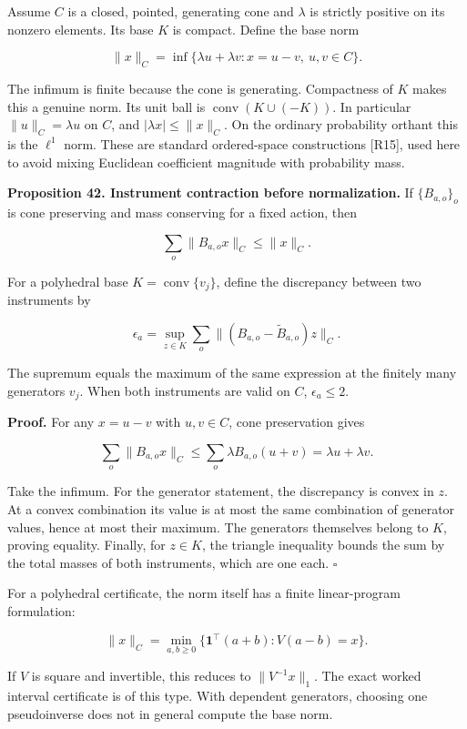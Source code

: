 \documentclass[11pt,letterpaper]{article}
\begin{document}
Assume \(C\) is a closed, pointed, generating cone and \(\lambda\) is
strictly positive on its nonzero elements. Its base \(K\) is compact.
Define the base norm

\[
\|x\|_C=\inf\{\lambda u+\lambda v:x=u-v,\ u,v\in C\}.
\]

The infimum is finite because the cone is generating. Compactness of
\(K\) makes this a genuine norm. Its unit ball is
\(\operatorname{conv}(K\cup(-K))\). In particular \(\|u\|_C=\lambda u\)
on \(C\), and \(|\lambda x|\leq\|x\|_C\). On the ordinary probability
orthant this is the \(\ell^1\) norm. These are standard ordered-space
constructions {[}R15{]}, used here to avoid mixing Euclidean coefficient
magnitude with probability mass.

\textbf{Proposition 42. Instrument contraction before normalization.} If
\(\{B_{a,o}\}_o\) is cone preserving and mass conserving for a fixed
action, then

\[
\boxed{\sum_o\|B_{a,o}x\|_C\leq\|x\|_C.}
\]

For a polyhedral base \(K=\operatorname{conv}\{v_j\}\), define the
discrepancy between two instruments by

\[
\epsilon_a=\sup_{z\in K}\sum_o
\|(B_{a,o}-\widetilde B_{a,o})z\|_C.
\]

The supremum equals the maximum of the same expression at the finitely
many generators \(v_j\). When both instruments are valid on \(C\),
\(\epsilon_a\leq2\).

\textbf{Proof.} For any \(x=u-v\) with \(u,v\in C\), cone preservation
gives

\[
\sum_o\|B_{a,o}x\|_C
\leq\sum_o\lambda B_{a,o}(u+v)
=\lambda u+\lambda v.
\]

Take the infimum. For the generator statement, the discrepancy is convex
in \(z\). At a convex combination its value is at most the same
combination of generator values, hence at most their maximum. The
generators themselves belong to \(K\), proving equality. Finally, for
\(z\in K\), the triangle inequality bounds the sum by the total masses
of both instruments, which are one each. \(\square\)

For a polyhedral certificate, the norm itself has a finite
linear-program formulation:

\[
\|x\|_C=\min_{a,b\geq0}
\{\mathbf1^\top(a+b):V(a-b)=x\}.
\]

If \(V\) is square and invertible, this reduces to \(\|V^{-1}x\|_1\).
The exact worked interval certificate is of this type. With dependent
generators, choosing one pseudoinverse does not in general compute the
base norm.
\end{document}
